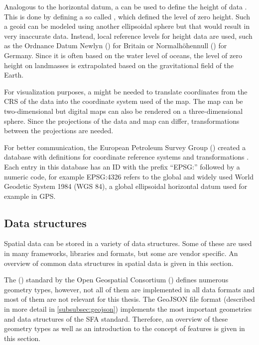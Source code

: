 		Analogous to the horizontal datum, a  can be used to define the height of data \cite{ordenance-survey-booklet}.
		This is done by defining a so called , which defined the level of zero height.
		Such a geoid can be modeled using another ellipsoidal sphere but that would result in very inaccurate data.
		Instead, local reference levels for height data are used, such as the Ordnance Datum Newlyn () for Britain or Normalhöhennull () for Germany.
		Since it is often based on the water level of oceans, the level of zero height on landmasses is extrapolated based on the gravitational field of the Earth.
		
		For visualization purposes, a  might be needed to translate coordinates from the CRS of the data into the coordinate system used of the map.
		The map can be two-dimensional but digital maps can also be rendered on a three-dimensional sphere.
		Since the projections of the data and map can differ, transformations between the projections are needed.
		
		For better communication, the European Petroleum Survey Group () created a database with definitions for coordinate reference systems and transformations \cite{epsg}.
		Each entry in this database has an ID with the prefix \enquote{EPSG:} followed by a numeric code, for example EPSG:4326 refers to the global and widely used World Geodetic System 1984 (WGS 84), a global ellipsoidal horizontal datum used for example in GPS.
		
	\subsection{Data structures}
	\label{subsec:data-structures}
	
		Spatial data can be stored in a variety of data structures.
		Some of these are used in many frameworks, libraries and formats, but some are vendor specific.
		An overview of common data structures in spatial data is given in this section.
		
		The  () standard by the Open Geospatial Consortium () defines numerous geometry types\cite{ogc-sfa}, however, not all of them are implemented in all data formats and most of them are not relevant for this thesis.
		The GeoJSON file format (described in more detail in \cref{subsubsec:geojson}) implements the most important geometries and data structures of the SFA standard\cite{ietf-geojson}.
		Therefore, an overview of these geometry types as well as an introduction to the concept of features is given in this section.
		
